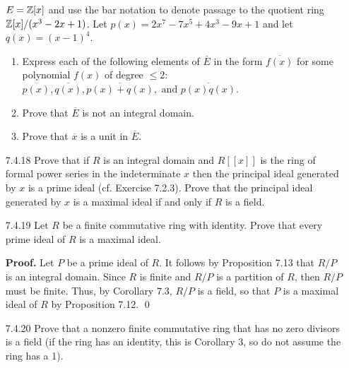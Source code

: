\begin{enumerate}
                  $E = \mathbb{Z}[x]$ and use the bar notation to denote passage to the
                  quotient ring $\mathbb{Z}[x]/(x^3 - 2x + 1)$. Let
                  $p(x) = 2x^7 - 7x^5 + 4x^3 - 9x + 1$ and let
                  $q(x) = (x - 1)^4$.
                  \begin{enumerate}
                     \item Express each of the following elements of
                           $\overline{E}$ in the form $\overline{f(x)}$ for some
                           polynomial $f(x)$ of degree $\le 2$:
                           $\overline{p(x)}, \overline{q(x)},
                             \overline{p(x) + q(x)}, \text{ and }
                             \overline{p(x)q(x)}$.
                     \item Prove that $\overline{E}$ is not an integral domain.
                     \item Prove that $\overline{x}$ is a unit in
                           $\overline{E}$.
                  \end{enumerate}
   \item[7.4.18]  Prove that if $R$ is an integral domain and $R[[x]]$ is the
                  ring of formal power series in the indeterminate $x$ then the
                  principal ideal generated by $x$ is a prime ideal
                  (cf. Exercise 7.2.3). Prove that the principal ideal generated
                  by $x$ is a maximal ideal if and only if $R$ is a field.
   \item[7.4.19]  Let $R$ be a finite commutative ring with identity. Prove that
                  every prime ideal of $R$ is a maximal ideal.
                  
      \textbf{Proof.} Let $P$ be a prime ideal of $R$. It follows by Proposition
      7.13 that $R/P$ is an integral domain. Since $R$ is finite and $R/P$ is a
      partition of $R$, then $R/P$ must be finite. Thus, by Corollary 7.3,
      $R/P$ is a field, so that $P$ is a maximal ideal of $R$ by
      Proposition 7.12. \qed
   \item[7.4.20]  Prove that a nonzero finite commutative ring that has no zero
                  divisors is a field (if the ring has an identity, this is
                  Corollary 3, so do not assume the ring has a 1).
                  

\end{enumerate}
